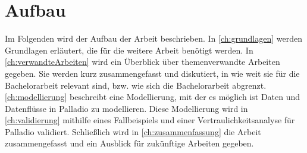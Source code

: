 \section{Aufbau}
\label{sec:aufbau}
Im Folgenden wird der Aufbau der Arbeit beschrieben. In \autoref{ch:grundlagen} werden Grundlagen erläutert, die für die weitere Arbeit benötigt werden. In \autoref{ch:verwandteArbeiten} wird ein Überblick über themenverwandte Arbeiten gegeben. Sie werden kurz zusammengefasst und diskutiert, in wie weit sie für die Bachelorarbeit relevant sind, bzw. wie sich die Bachelorarbeit abgrenzt. \autoref{ch:modellierung} beschreibt eine Modellierung, mit der es möglich ist Daten und Datenflüsse in Palladio zu modellieren. Diese Modellierung wird in \autoref{ch:validierung} mithilfe eines Fallbeispiels und einer Vertraulichkeitsanalyse für Palladio validiert. Schließlich wird in \autoref{ch:zusammenfassung} die Arbeit zusammengefasst und ein Ausblick für zukünftige Arbeiten gegeben.
